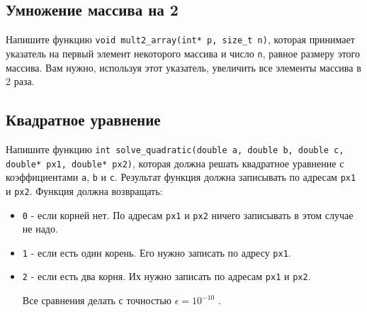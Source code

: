 \documentclass{article}
\begin{document}
\subsection{Умножение массива на 2}
Напишите функцию \texttt{void mult2\_array(int* p, size\_t n)}, которая принимает указатель на первый элемент некоторого массива и число \texttt{n}, равное размеру этого массива. Вам нужно, используя этот указатель, увеличить все элементы массива в 2 раза.


\subsection{Квадратное уравнение}
Напишите функцию \texttt{int solve\_quadratic(double a, double b, double c, double* px1, double* px2)}, которая должна решать квадратное уравнение с коэффициентами \texttt{a}, \texttt{b} и \texttt{c}. Результат функция должна записывать по адресам \texttt{px1} и \texttt{px2}. Функция должна возвращать:
\begin{itemize}
\item \texttt{0} - если корней нет. По адресам \texttt{px1} и \texttt{px2} ничего записывать в этом случае не надо.
\item \texttt{1} - если есть один корень. Его нужно записать по адресу \texttt{px1}.
\item \texttt{2} - если есть два корня. Их нужно записать по адресам \texttt{px1} и \texttt{px2}.

Все сравнения делать с точностью $\epsilon = 10^{-10}$ .


\end{itemize}
\end{document}
